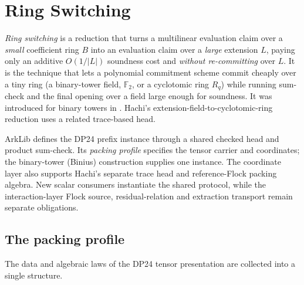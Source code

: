 \section{Ring Switching}\label{sec:ring_switching}

\emph{Ring switching} is a reduction that turns a multilinear evaluation claim over a \emph{small}
coefficient ring $B$ into an evaluation claim over a \emph{large} extension $L$, paying only an
additive $O(1/\lvert L\rvert)$ soundness cost and \emph{without re-committing} over $L$. It is the
technique that lets a polynomial commitment scheme commit cheaply over a tiny ring (a binary-tower
field, $\mathbb{F}_2$, or a cyclotomic ring $R_q$) while running sum-check and the final opening over
a field large enough for soundness. It was introduced for binary towers in \cite{DP24}. Hachi's
extension-field-to-cyclotomic-ring reduction \cite{NOZ26} uses a related trace-based head.

ArkLib defines the DP24 prefix instance through a shared checked head and product sum-check.
Its \emph{packing profile} specifies the tensor carrier and coordinates; the binary-tower
(Binius) construction supplies one instance. The coordinate layer also supports Hachi's separate
trace head and reference-Flock packing algebra. New scalar consumers instantiate the shared
protocol, while the interaction-layer Flock source, residual-relation and extraction transport
remain separate
obligations.

\subsection{The packing profile}

The data and algebraic laws of the DP24 tensor presentation are collected into a single structure.

